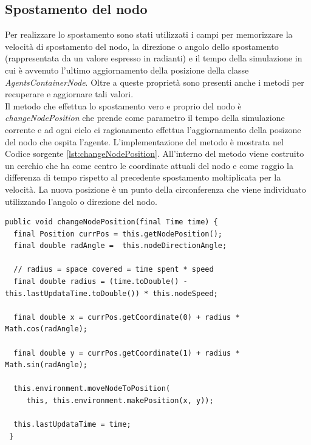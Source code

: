 \documentclass[12pt,a4paper,openright,twoside]{report}
\begin{document}
\subsection{Spostamento del nodo}
Per realizzare lo spostamento sono stati utilizzati i campi per memorizzare la velocit\`a di spostamento del nodo, la direzione o angolo dello spostamento (rappresentata da un valore espresso in radianti) e il tempo della simulazione in cui \`e avvenuto l'ultimo aggiornamento della posizione della classe \textit{AgentsContainerNode}.
Oltre a queste propriet\`a sono presenti anche i metodi per recuperare e aggiornare tali valori.
\\
Il metodo che effettua lo spostamento vero e proprio del nodo \`e \textit{changeNodePosition} che prende come parametro il tempo della simulazione corrente e ad ogni ciclo ci ragionamento effettua l'aggiornamento della posizone del nodo che ospita l'agente. L'implementazione del metodo \`e mostrata nel Codice sorgente \ref{lst:changeNodePosition}. All'interno del metodo viene costruito un cerchio che ha come centro le coordinate attuali del nodo e come raggio la differenza di tempo rispetto al precedente spostamento moltiplicata per la velocit\`a. La nuova posizione \`e un punto della circonferenza che viene individuato utilizzando l'angolo o direzione del nodo.
\medskip
{}
\begin{lstlisting}[firstnumber=1,label={lst:changeNodePosition},caption={Implementazione spostamento nodo}]
public void changeNodePosition(final Time time) {
  final Position currPos = this.getNodePosition();
  final double radAngle =  this.nodeDirectionAngle;

  // radius = space covered = time spent * speed
  final double radius = (time.toDouble() - this.lastUpdataTime.toDouble()) * this.nodeSpeed;

  final double x = currPos.getCoordinate(0) + radius * Math.cos(radAngle);

  final double y = currPos.getCoordinate(1) + radius * Math.sin(radAngle);

  this.environment.moveNodeToPosition(
     this, this.environment.makePosition(x, y));

  this.lastUpdataTime = time;
 }
\end{lstlisting}
\end{document}
